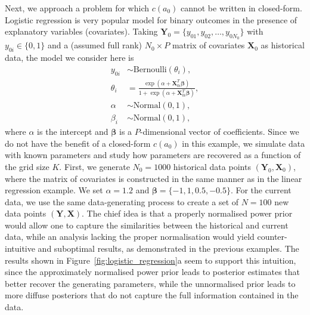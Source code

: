 \documentclass[a4paper, notitlepage, 11pt]{article}
\begin{document}
Next, we approach a problem for which $c(a_0)$ cannot be written in closed-form.
Logistic regression is very popular model for binary outcomes in the presence of explanatory variables (covariates). 
Taking $\boldsymbol Y_0 = \{y_{01}, y_{02}, \ldots, y_{0N_0} \}$ with $y_{0i} \in \{0, 1\}$ and a (assumed full rank) $N_0 \times P$ matrix of covariates $\boldsymbol X_0$ as historical data, the model we consider here is 
\begin{align*}
 y_{0i} &\sim \text{Bernoulli}(\theta_i), \\
 \theta_i &= \frac{\exp(\alpha + \boldsymbol X_{0i}^T \boldsymbol \beta)}{1 + \exp(\alpha + \boldsymbol X_{0i}^T \boldsymbol \beta)},\\
 \alpha & \sim \text{Normal}(0, 1), \\
 \beta_i &\sim \text{Normal}(0, 1),
\end{align*}
where $\alpha$ is the intercept and $\boldsymbol\beta$ is a $P$-dimensional vector of coefficients.
Since we do not have the benefit of a closed-form $c(a_0)$ in this example, we simulate data with known parameters and study how parameters are recovered as a function of the grid size $K$.
First, we generate $N_0 = 1000$ historical data points $(\boldsymbol Y_0, \boldsymbol X_0)$, where the matrix of covariates is constructed in the same manner as in the linear regression example.
We set $\alpha = 1.2$ and $\boldsymbol\beta = \{ -1, 1, 0.5, -0.5\}$.
For the current data, we use the same data-generating process to create a set of $N = 100$ new data points $(\boldsymbol Y, \boldsymbol X)$.
The chief idea is that a properly normalised power prior would allow one to capture the similarities between the historical and current data, while an analysis lacking the proper normalisation would yield counter-intuitive and suboptimal results, as demonstrated in the previous examples.
The results shown in Figure~\ref{fig:logistic_regression}a seem to support this intuition, since the approximately normalised power prior leads to posterior estimates that better recover the generating parameters, while the unnormalised prior leads to more diffuse posteriors that do not capture the full information contained in the data. 
\end{document}
